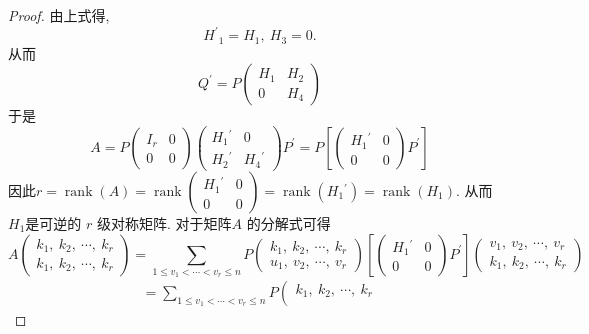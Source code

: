 \begin{proof}
	由上式得,\ 
	$$H^{\prime}{ }_{1}=H_{1},\  H_{3}=0 .$$
	从而
	$$Q^{\prime}=P\left(\begin{array}{cc}
		H_{1} & H_{2} \\
		0 & H_{4}
	\end{array}\right)$$
	于是
	$$A=P\left(\begin{array}{cc}
		I_{r} & 0 \\
		0 & 0
	\end{array}\right)\left(\begin{array}{cc}
		H_{1}{ }^{\prime} & 0 \\
		H_{2}{ }^{\prime} & H_{4}{ }^{\prime}
	\end{array}\right) P^{\prime}=P\left[\left(\begin{array}{cc}
		H_{1}{ }^{\prime} & 0 \\
		0 & 0
	\end{array}\right) P^{\prime}\right]$$
	因此$  r=\operatorname{rank}(A)=\operatorname{rank}\left(\begin{array}{cc}H_{1}{ }^{\prime} & 0 \\ 0 & 0\end{array}\right)=\operatorname{rank}\left(H_{1}{ }^{\prime}\right)=\operatorname{rank}\left(H_{1}\right) .$
	从而 $ H_{1}  $是可逆的  $r $ 级对称矩阵.
	对于矩阵$  A $ 的分解式可得
	$$A\left(\begin{array}{l}
		k_{1},\  k_{2},\  \cdots,\  k_{r} \\
		k_{1},\  k_{2},\  \cdots,\  k_{r}
	\end{array}\right)=\sum_{1 \leqslant v_{1}<\cdots<v_{r} \leqslant n} P\left(\begin{array}{l}
		k_{1},\  k_{2},\  \cdots,\  k_{r} \\
		u_{1},\  v_{2},\  \cdots,\  v_{r}
	\end{array}\right)\left[\left(\begin{array}{cc}
		H_{1}{ }^{\prime} & 0 \\
		0 & 0
	\end{array}\right) P^{\prime}\right]\left(\begin{array}{l}
		v_{1},\  v_{2},\  \cdots,\  v_{r} \\
		k_{1},\  k_{2},\  \cdots,\  k_{r}
	\end{array}\right)$$
	$$\begin{array}{l}
		=\sum\limits_{1 \leqslant v_{1}<\cdots<v_{r} \leqslant n} P\left(\begin{array}{l}
			k_{1},\  k_{2},\  \cdots,\  k_{r} \\

\end{array}
\end{array}$$
\end{proof}
